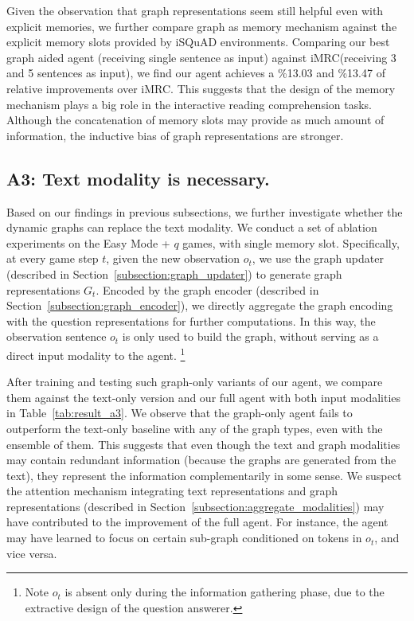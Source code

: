 \documentclass[11pt]{article}
\newcommand{\isquad}{iSQuAD\xspace}
\newcommand{\imrc}{iMRC\xspace}
\begin{document}
Given the observation that graph representations seem still helpful even with explicit memories, we further compare graph as memory mechanism against the explicit memory slots provided by \isquad environments.
Comparing our best graph aided agent (receiving single sentence as input) against \imrc (receiving 3 and 5 sentences as input), we find our agent achieves a \%13.03 and \%13.47 of relative improvements over \imrc.
This suggests that the design of the memory mechanism plays a big role in the interactive reading comprehension tasks.
Although the concatenation of memory slots may provide as much amount of information, the inductive bias of graph representations are stronger.


\subsection*{A3: Text modality is necessary.}
\label{subsection:a3}

Based on our findings in previous subsections, we further investigate whether the dynamic graphs can replace the text modality.
We conduct a set of ablation experiments on the Easy Mode + $q$ games, with single memory slot.
Specifically, at every game step $t$, given the new observation $o_t$, we use the graph updater (described in Section~\ref{subsection:graph_updater}) to generate graph representations $G_t$.
Encoded by the graph encoder (described in Section~\ref{subsection:graph_encoder}), we directly aggregate the graph encoding with the question representations for further computations. 
In this way, the observation sentence $o_t$ is only used to build the graph, without serving as a direct input modality to the agent. \footnote{Note $o_t$ is absent only during the information gathering phase, due to the extractive design of the question answerer.}

After training and testing such graph-only variants of our agent, we compare them against the text-only version \citep{yuan2020imrc} and our full agent with both input modalities in Table~\ref{tab:result_a3}.
We observe that the graph-only agent fails to outperform the text-only baseline with any of the graph types, even with the ensemble of them.
This suggests that even though the text and graph modalities may contain redundant information (because the graphs are generated from the text), they represent the information complementarily in some sense.
We suspect the attention mechanism integrating text representations and graph representations (described in Section~\ref{subsection:aggregate_modalities}) may have contributed to the improvement of the full agent.
For instance, the agent may have learned to focus on certain sub-graph conditioned on tokens in $o_t$, and vice versa. 
\end{document}
